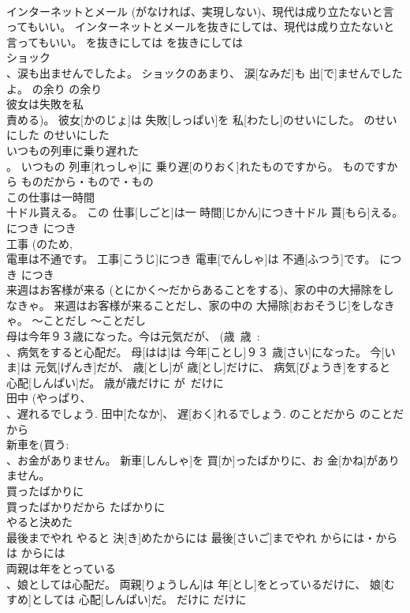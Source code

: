 \documentclass[8pt]{extreport}
\begin{document}
\begin{CJK}{UTF8}{min}
\\	インターネットとメール (がなければ、実現しない)、現代は成り立たないと言ってもいい。	インターネットとメールを抜きにしては、現代は成り立たないと言ってもいい。	を抜きにしては	を抜きにしては	
\\	ショック 
\\	、涙も出ませんでしたよ。	ショックのあまり、 涙[なみだ]も 出[で]ませんでしたよ。	の余り	の余り	
\\	彼女は失敗を私
\\	責める)。	彼女[かのじょ]は 失敗[しっぱい]を 私[わたし]のせいにした。	のせいにした	のせいにした	
\\	いつもの列車に乗り遅れた 
\\	。	いつもの 列車[れっしゃ]に 乗り遅[のりおく]れたものですから。	ものですから	ものだから・もので・もの	
\\	この仕事は一時間 
\\	十ドル貰える。	この 仕事[しごと]は一 時間[じかん]につき十ドル 貰[もら]える。	につき	につき	
\\	工事 (のため, 
\\	電車は不通です。	工事[こうじ]につき 電車[でんしゃ]は 不通[ふつう]です。	につき	につき	
\\	来週はお客様が来る (とにかく～だからあることをする)、家の中の大掃除をしなきゃ。	来週はお客様が来ることだし、家の中の 大掃除[おおそうじ]をしなきゃ。	～ことだし	～ことだし	
\\	母は今年９３歳になった。今は元気だが、 (歳~歳~: 
\\	、病気をすると心配だ。	母[はは]は 今年[ことし]９３ 歳[さい]になった。 今[いま]は 元気[げんき]だが、 歳[とし]が 歳[とし]だけに、 病気[びょうき]をすると 心配[しんぱい]だ。	歳が歳だけに	が~だけに	
\\	田中 (やっぱり、
\\	、遅れるでしょう.	田中[たなか]、 遅[おく]れるでしょう.	のことだから	のことだから	
\\	新車を(買う: 
\\	、お金がありません。	新車[しんしゃ]を 買[か]ったばかりに、お 金[かね]がありません。	
\\	買ったばかりに
\\	買ったばかりだから	たばかりに	
\\	やると決めた 
\\	最後までやれ	やると 決[き]めたからには 最後[さいご]までやれ	からには・からは	からには	
\\	両親は年をとっている
\\	、娘としては心配だ。	両親[りょうしん]は 年[とし]をとっているだけに、 娘[むすめ]としては 心配[しんぱい]だ。	だけに	だけに	

\end{CJK}
\end{document}
